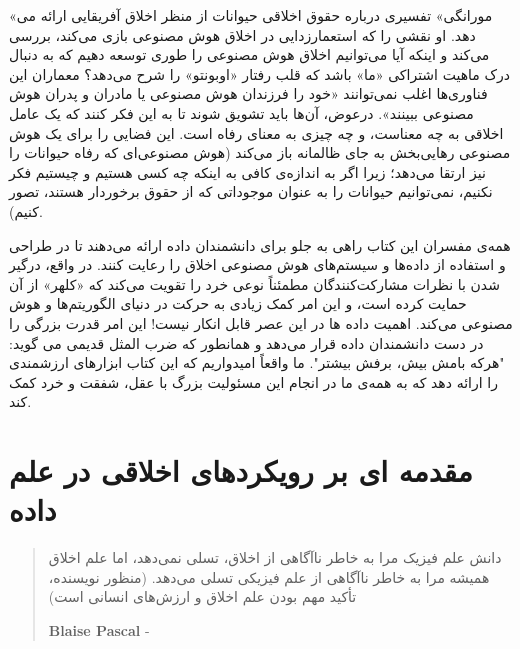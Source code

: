 \documentclass[12pt,oneside]{book}
\begin{document}
    «مورانگی» تفسیری درباره حقوق اخلاقی حیوانات از منظر اخلاق آفریقایی ارائه می دهد.
    او نقشی را که استعمارزدایی در اخلاق هوش مصنوعی بازی می‌کند، بررسی می‌کند و اینکه آیا می‌توانیم اخلاق هوش مصنوعی را طوری توسعه دهیم که به دنبال درک ماهیت اشتراکی «ما» باشد که قلب رفتار «اوبونتو» را شرح می‌دهد؟ معماران این فناوری‌ها اغلب نمی‌توانند «خود را فرزندان هوش مصنوعی یا مادران و پدران هوش مصنوعی ببینند».
    درعوض، آن‌ها باید تشویق شوند تا به این فکر کنند که یک عامل اخلاقی به چه معناست، و چه چیزی به معنای رفاه است.
    این فضایی را برای یک هوش مصنوعی رهایی‌بخش به جای ظالمانه باز می‌کند (هوش مصنوعی‌ای که رفاه حیوانات را نیز ارتقا می‌دهد؛ زیرا اگر به اندازه‌ی کافی به اینکه چه کسی هستیم و چیستیم فکر نکنیم، نمی‌توانیم حیوانات را به عنوان موجوداتی که از حقوق برخوردار هستند، تصور کنیم).

    همه‌ی مفسران این کتاب راهی به جلو برای دانشمندان داده ارائه می‌دهند تا در طراحی و استفاده از داده‌ها و سیستم‌های هوش مصنوعی اخلاق را رعایت کنند.
    در واقع، درگیر شدن با نظرات مشارکت‌کنندگان مطمئناً نوعی خرد را تقویت می‌کند که «کلهر» از آن حمایت کرده است، و این امر کمک زیادی به حرکت در دنیای الگوریتم‌ها و هوش مصنوعی می‌کند.
    اهمیت داده ها در این عصر قابل انکار نیست!
    این امر قدرت بزرگی را در دست دانشمندان داده قرار می‌دهد و همانطور که ضرب المثل قدیمی می گوید: "هرکه بامش بیش، برفش بیشتر".
    ما واقعاً امیدواریم که این کتاب ابزارهای ارزشمندی را ارائه دهد که به همه‌ی ما در انجام این مسئولیت بزرگ با عقل، شفقت و خرد کمک کند.


    \chapter{مقدمه ای بر رویکردهای اخلاقی در علم داده}

    \begin{quote}
        دانش علم فیزیک مرا به خاطر ناآگاهی از اخلاق، تسلی نمی‌دهد، اما علم اخلاق همیشه مرا به خاطر ناآگاهی از علم فیزیکی تسلی می‌دهد.
        (منظور نویسنده، تأکید مهم بودن علم اخلاق و ارزش‌های انسانی است)
        \begin{flushleft}
            \textenglish{\textbf{Blaise Pascal} -}
        \end{flushleft}
    \end{quote}
\end{document}
